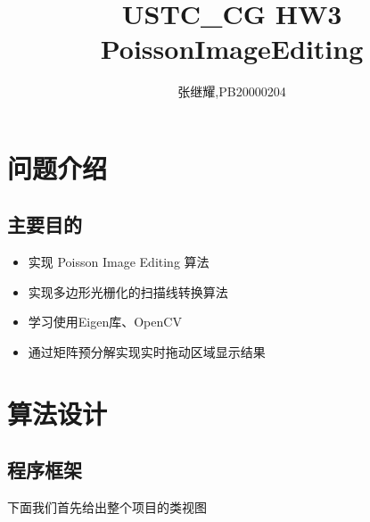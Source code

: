 \documentclass{article}
\title{USTC\_CG HW3 PoissonImageEditing}
\author{张继耀,PB20000204}
\begin{document}
	\maketitle
	
	\tableofcontents
	
	\section {问题介绍}
	\subsection{主要目的}
	
	\begin{itemize}
		\item 实现 Poisson Image Editing 算法
	\end{itemize}
	
	\begin{itemize}
		\item 实现多边形光栅化的扫描线转换算法
	\end{itemize}
	
	\begin{itemize}
		\item 学习使用Eigen库、OpenCV
	\end{itemize}
	\begin{itemize}
	\item 通过矩阵预分解实现实时拖动区域显示结果
    \end{itemize}
	
		
	\section{算法设计}
	
	\subsection{程序框架}
	
	下面我们首先给出整个项目的类视图
	
\end{document}
